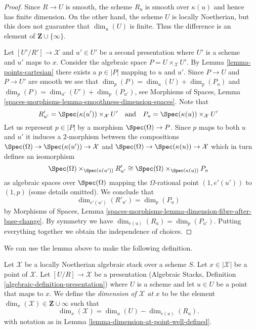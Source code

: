 \begin{proof}
Since $R \to U$ is smooth, the scheme $R_u$ is smooth over $\kappa(u)$
and hence has finite dimension. On the other hand, the scheme $U$
is locally Noetherian, but this does not guarantee that
$\dim_u(U)$ is finite. Thus the difference is an element of
$\mathbf{Z} \cup \{\infty\}$.

\medskip\noindent
Let $[U'/R'] \to \mathcal{X}$ and $u' \in U'$ be a second presentation
where $U'$ is a scheme and $u'$ maps to $x$. Consider the algebraic
space $P = U \times_\mathcal{X} U'$. By
Lemma \ref{lemma-points-cartesian} there exists a $p \in |P|$ mapping to
$u$ and $u'$. Since $P \to U$ and $P \to U'$ are smooth we see that
$\dim_p(P) = \dim_u(U) + \dim_p(P_u)$ and
$\dim_p(P) = \dim_{u'}(U') + \dim_p(P_{u'})$, see
Morphisms of Spaces, Lemma
\ref{spaces-morphisms-lemma-smoothness-dimension-spaces}.
Note that
$$
R'_{u'} = \Spec(\kappa(u')) \times_\mathcal{X} U'
\quad\text{and}\quad
P_u = \Spec(\kappa(u)) \times_\mathcal{X} U'
$$
Let us represent $p \in |P|$ by a morphism $\Spec(\Omega) \to P$.
Since $p$ maps to both $u$ and $u'$ it induces a $2$-morphism
between the compositions
$\Spec(\Omega) \to \Spec(\kappa(u')) \to \mathcal{X}$ and
$\Spec(\Omega) \to \Spec(\kappa(u)) \to \mathcal{X}$
which in turn defines an isomorphism
$$
\Spec(\Omega) \times_{\Spec(\kappa(u'))} R'_{u'}
\cong
\Spec(\Omega) \times_{\Spec(\kappa(u))} P_u
$$
as algebraic spaces over $\Spec(\Omega)$ mapping the $\Omega$-rational
point $(1, e'(u'))$ to $(1, p)$ (some details omitted). We conclude that
$$
\dim_{e'(u')}(R'_{u'}) = \dim_p(P_u)
$$
by Morphisms of Spaces, Lemma
\ref{spaces-morphisms-lemma-dimension-fibre-after-base-change}.
By symmetry we have
$\dim_{e(u)}(R_u) = \dim_p(P_{u'})$.
Putting everything together we obtain the independence of choices.
\end{proof}

\noindent
We can use the lemma above to make the following definition.

\begin{definition}
\label{definition-dimension-at-point}
Let $\mathcal{X}$ be a locally Noetherian algebraic stack over a scheme $S$.
Let $x \in |\mathcal{X}|$ be a point of $\mathcal{X}$.
Let $[U/R] \to \mathcal{X}$ be a presentation
(Algebraic Stacks, Definition \ref{algebraic-definition-presentation})
where $U$ is a scheme
and let $u \in U$ be a point that maps to $x$.
We define the {\it dimension of $\mathcal{X}$ at $x$} to be
the element $\dim_x(\mathcal{X}) \in \mathbf{Z} \cup \infty$
such that 
$$
\dim_x(\mathcal{X}) = \dim_u(U)-\dim_{e(u)}(R_u).
$$
with notation as in Lemma \ref{lemma-dimension-at-point-well-defined}.
\end{definition}

